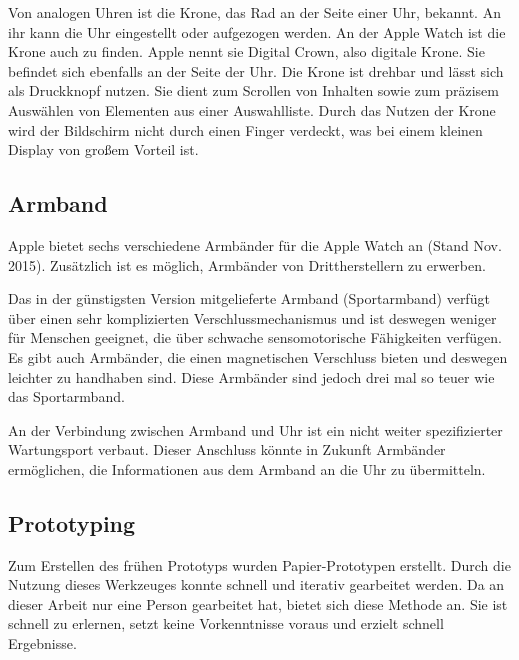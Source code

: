  Von analogen Uhren ist die Krone, das Rad an der Seite einer Uhr, bekannt. An ihr kann die Uhr eingestellt oder aufgezogen werden. An der Apple Watch ist die Krone auch zu finden. Apple nennt sie \glqq Digital Crown\grqq, also digitale Krone. Sie befindet sich ebenfalls an der Seite der Uhr. Die Krone ist drehbar und lässt sich als Druckknopf nutzen. Sie dient zum Scrollen von Inhalten sowie zum präzisem Auswählen von Elementen aus einer Auswahlliste. Durch das Nutzen der Krone wird der Bildschirm nicht durch einen Finger verdeckt, was bei einem kleinen Display von großem Vorteil ist.
\subsection{Armband}
Apple bietet sechs verschiedene Armbänder für die Apple Watch an (Stand Nov. 2015). Zusätzlich ist es möglich, Armbänder von Drittherstellern zu erwerben. 

Das in der günstigsten Version mitgelieferte Armband (Sportarmband) verfügt über einen sehr komplizierten Verschlussmechanismus und ist deswegen weniger für Menschen geeignet, die über schwache sensomotorische Fähigkeiten verfügen. Es gibt auch Armbänder, die einen magnetischen Verschluss bieten und deswegen leichter zu handhaben sind. Diese Armbänder sind jedoch drei mal so teuer wie das Sportarmband.

An der Verbindung zwischen Armband und Uhr ist ein nicht weiter spezifizierter Wartungsport verbaut. Dieser Anschluss könnte in Zukunft Armbänder ermöglichen, die Informationen aus dem Armband an die Uhr zu übermitteln.
\subsection{Prototyping}
Zum Erstellen des frühen Prototyps wurden Papier-Prototypen erstellt. Durch die Nutzung dieses Werkzeuges konnte schnell und iterativ gearbeitet werden. Da an dieser Arbeit nur eine Person gearbeitet hat, bietet sich diese Methode an. Sie ist schnell zu erlernen, setzt keine Vorkenntnisse voraus und erzielt schnell Ergebnisse.


